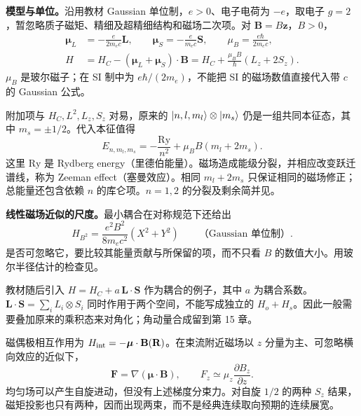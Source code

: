 \textbf{模型与单位。}沿用教材 Gaussian 单位制，$e>0$、电子电荷为 $-e$，取电子 $g=2$，暂忽略质子磁矩、精细及超精细结构和磁场二次项。对 $\mathbf B=B\hat{\mathbf z}$，$B>0$，
\begin{align}
  \boldsymbol\mu_L&=-\frac{e}{2m_ec}\mathbf L,\qquad
  \boldsymbol\mu_S=-\frac{e}{m_ec}\mathbf S,\qquad
  \mu_B=\frac{e\hbar}{2m_ec},\\
  H&=H_C-(\boldsymbol\mu_L+\boldsymbol\mu_S)\cdot\mathbf B
    =\boxed{H_C+\frac{\mu_BB}{\hbar}(L_z+2S_z).}
\end{align}
$\mu_B$ 是玻尔磁子；在 SI 制中为 $e\hbar/(2m_e)$，不能把 SI 的磁场数值直接代入带 $c$ 的 Gaussian 公式。

附加项与 $H_C,L^2,L_z,S_z$ 对易，原来的 $\left|n,l,m_l\right\rangle\otimes\left|m_s\right\rangle$ 仍是一组共同本征态，其中 $m_s=\pm1/2$。代入本征值得
\begin{equation}
  \boxed{E_{n,m_l,m_s}=-\frac{\mathrm{Ry}}{n^2}
     +\mu_BB(m_l+2m_s).}
\end{equation}
这里 $\mathrm{Ry}$ 是 Rydberg energy（里德伯能量）。磁场造成能级分裂，并相应改变跃迁谱线，称为 Zeeman effect（塞曼效应）。相同 $m_l+2m_s$ 只保证相同的磁场修正；总能量还包含依赖 $n$ 的库仑项。$n=1,2$ 的分裂及剩余简并见。

\textbf{线性磁场近似的尺度。}最小耦合在对称规范下还给出
\begin{equation}
  H_{B^2}=\frac{e^2B^2}{8m_ec^2}(X^2+Y^2)
  \qquad\text{（Gaussian 单位制）}.
\end{equation}
是否可忽略它，要比较其能量贡献与所保留的项，而不只看 $B$ 的数值大小。用玻尔半径估计的检查见。


教材随后引入 $H=H_C+a\,\mathbf L\cdot\mathbf S$ 作为耦合的例子，其中 $a$ 为耦合系数。$\mathbf L\cdot\mathbf S=\sum_iL_i\otimes S_i$ 同时作用于两个空间，不能写成独立的 $H_o+H_s$。因此一般需要叠加原来的乘积态来对角化；角动量合成留到第 15 章。


磁偶极相互作用为 $H_{\rm int}=-\boldsymbol\mu\cdot\mathbf B(\mathbf R)$。在束流附近磁场以 $z$ 分量为主、可忽略横向效应的近似下，
\begin{equation}
  \mathbf F=\nabla(\boldsymbol\mu\cdot\mathbf B),\qquad
  \boxed{F_z\simeq\mu_z\frac{\partial B_z}{\partial z}.}
\end{equation}
均匀场可以产生自旋进动，但没有上述梯度分束力。对自旋 $1/2$ 的两种 $S_z$ 结果，磁矩投影也只有两种，因而出现两束，而不是经典连续取向预期的连续展宽。

